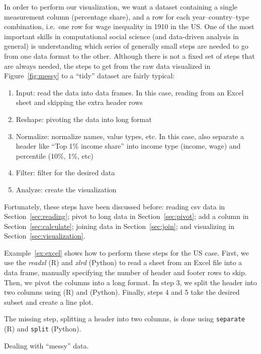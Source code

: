 In order to perform our visualization, we want a dataset containing a single measurement column (percentage share),
and a row for each year--country--type combination, i.e.\ one row for wage inequality in 1910 in the US.
One of the most important skills in computational social science (and data-driven analysis in general) is
understanding which series of generally small steps are needed to go from one data format to the other.
Although there is not a fixed set of steps that are always needed, the steps to get from the raw data visualized in Figure~\ref{fig:messy} to a ``tidy'' dataset are fairly typical:

\begin{enumerate}
  \item Input:  read the data into data frames. In this case, reading from an Excel sheet and skipping the extra header rows
  \item Reshape: pivoting the data into long format
  \item Normalize: normalize names, value types, etc. In this case, also separate a header like ``Top 1\% income share'' into income type (income, wage) and percentile (10\%, 1\%, etc)
  \item Filter: filter for the desired data
  \item Analyze: create the visualization
\end{enumerate}

Fortunately, these steps have been discussed before: reading csv data in Section~\ref{sec:reading}; pivot to long data in Section~\ref{sec:pivot};
add a column in Section~\ref{sec:calculate}; joining data in Section~\ref{sec:join}; and visualizing in Section~\ref{sec:visualization}.

Example~\ref{ex:excel} shows how to perform these steps for the US case.
First, we use the \emph{readxl} (R) and \emph{xlrd} (Python) to read a sheet from an Excel file into a data frame,
manually specifying the number of header and footer rows to skip.
 Then, we pivot the columns into a  long format.
In step 3, we split the header into two columns using  (R) and  (Python). Finally, steps 4 and 5 take the desired subset and create a line plot. 

The missing step, splitting a header into two columns, is done using \texttt{separate} (R) and \texttt{split} (Python).

\begin{ccsexample}
  \begin{tcolorbox}[title=Output]
    \texttt{[image: \{snippets/chapter06/excel2.r]}.png}
  \end{tcolorbox}
  \caption{Dealing with ``messy'' data.}\label{ex:excel}
\end{ccsexample}


